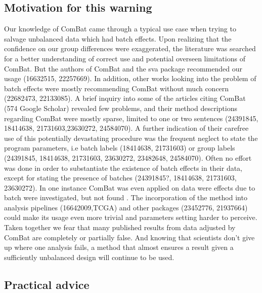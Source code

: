 \documentclass{bio}
\begin{document}
\subsection{Motivation for this warning}

Our knowledge of ComBat came through a typical use case when trying to salvage unbalanced data which had batch effects. Upon realizing that the confidence on our group differences were exaggerated, the literature was searched for a better understanding of correct use and potential overseen limitations of ComBat. But the authors of ComBat and the sva package recommended our usage (16632515, 22257669). In addition, other works looking into the problem of batch effects were mostly recommending ComBat without much concern (22682473, 22133085). A brief inquiry into  some of the articles citing ComBat (574 Google Scholar) revealed few problems, and their method descriptions regarding ComBat were mostly sparse, limited to one or two sentences (24391845, 18414638, 21731603,23630272, 24584070). A further indication of their carefree use of this potentially devastating procedure was the frequent neglect to state the program parameters, i.e batch labels (18414638, 21731603) or group labels (24391845, 18414638, 21731603, 23630272, 23482648, 24584070). Often no effort was done in order to substantiate the existence of batch effects in their data, except for stating the presence of batches (24391845?, 18414638, 21731603, 23630272). In one instance ComBat was even applied on data were effects due to batch were investigated, but not found . The incorporation of the method into analysis pipelines (16642009,TCGA) and other packages (23452776, 21937664) could make its usage even more trivial and parameters setting harder to perceive.
Taken together we fear that many published results from data adjusted by ComBat are completely or partially false. And knowing that scientists don't give up where one analysis fails, a method that almost ensures a result given a sufficiently unbalanced design will continue to be used.


\subsection{Practical advice}
\end{document}
